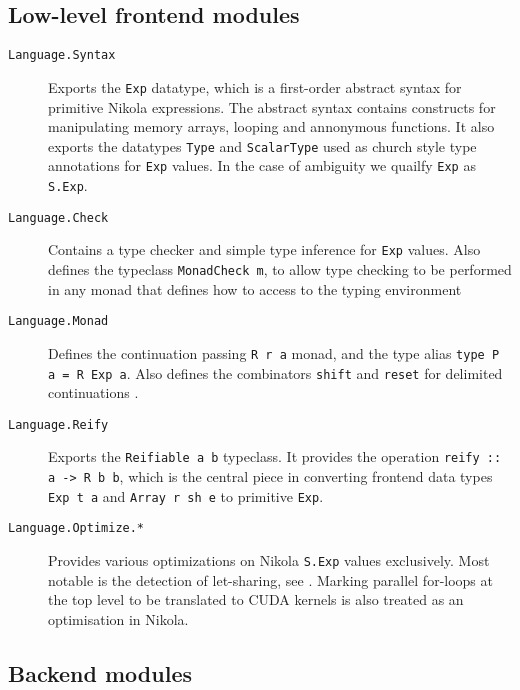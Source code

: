 \subsection*{Low-level frontend modules}
\begin{description}

  \item[\texttt{Language.Syntax}] Exports the \lstinline{Exp} datatype,
    which is a first-order abstract syntax for primitive Nikola expressions.
    The abstract syntax contains constructs for manipulating memory arrays,
    looping and annonymous functions. It also exports the datatypes
    \lstinline{Type} and \lstinline{ScalarType} used as church style type annotations
    for \lstinline{Exp} values. In the case of ambiguity we quailfy \lstinline{Exp}
    as \lstinline{S.Exp}.

  \item[\texttt{Language.Check}] Contains a type checker and simple type
    inference for \lstinline{Exp} values. Also defines the typeclass
    \lstinline{MonadCheck m}, to allow type checking to be performed in any monad
    that defines how to access to the typing environment

  \item[\texttt{Language.Monad}] Defines the continuation passing
    \lstinline{R r a} monad, and the type alias \lstinline{type P a = R Exp a}.
    Also defines the combinators \lstinline{shift} and \lstinline{reset} for
    delimited continuations \cite{wadler1994monads}.

  \item[\texttt{Language.Reify}] Exports the \lstinline{Reifiable a b}
    typeclass. It provides the operation \lstinline{reify :: a -> R b b},
    which is the central piece in converting frontend data types
    \lstinline{Exp t a} and \lstinline{Array r sh e} to primitive \lstinline{Exp}.

  \item[\texttt{Language.Optimize.*}] Provides various
    optimizations on Nikola \lstinline{S.Exp} values exclusively. Most notable is
    the detection of let-sharing, see \cite{mainland2010nikola}. Marking
    parallel for-loops at the top level to be translated to CUDA kernels is
    also treated as an optimisation in Nikola.

\end{description}

\subsection*{Backend modules}

